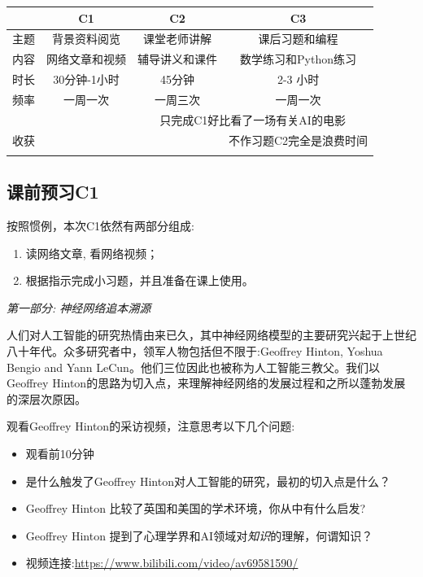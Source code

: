 \documentclass[12pt]{article}
\numberwithin{equation}{section}
\numberwithin{figure}{section}
\begin{document}
\begin{table}[H]
	\centering
	\renewcommand{\arraystretch}{1.6}
	\begin{tabular}{|c|c|c|c|}
		\hline
		& C1 & C2 & C3 \\
		\hline 
		主题& 背景资料阅览 & 课堂老师讲解 & 课后习题和编程 \\
		\hline
		内容& 网络文章和视频 & 辅导讲义和课件 & 数学练习和Python练习 \\
		\hline
		时长 & 30分钟-1小时 & 45分钟 & 2-3 小时 \\
		\hline 
		频率 & 一周一次 & 一周三次 & 一周一次 \\
		\hline 
		 & \checkmark & \multicolumn{2}{c|}{只完成C1好比看了一场有关AI的电影} \\
		\cline{2-4}
		收获&  \checkmark & \checkmark & 不作习题C2完全是浪费时间 \\
		\cline{2-4}
		& \checkmark & \checkmark & \checkmark \\
		\hline 
	\end{tabular}
\end{table}


\setcounter{section}{3}
\subsection{课前预习C1}

按照惯例，本次C1依然有两部分组成:
\begin{enumerate}
	\item 读网络文章, 看网络视频；
	\item 根据指示完成小习题，并且准备在课上使用。
\end{enumerate}

\noindent
\textit{第一部分: 神经网络追本溯源}

人们对人工智能的研究热情由来已久，其中神经网络模型的主要研究兴起于上世纪八十年代。众多研究者中，领军人物包括但不限于:Geoffrey Hinton,  Yoshua Bengio and Yann LeCun。他们三位因此也被称为人工智能三教父。我们以Geoffrey Hinton的思路为切入点，来理解神经网络的发展过程和之所以蓬勃发展的深层次原因。

观看Geoffrey Hinton的采访视频，注意思考以下几个问题:
\begin{itemize}
	\item 观看前10分钟
	\item 是什么触发了Geoffrey Hinton对人工智能的研究，最初的切入点是什么？
	\item Geoffrey Hinton 比较了英国和美国的学术环境，你从中有什么启发?
	\item Geoffrey Hinton 提到了心理学界和AI领域对\textit{知识}的理解，何谓知识？
	\item 视频连接:\url{https://www.bilibili.com/video/av69581590/}
\end{itemize}
\end{document}
